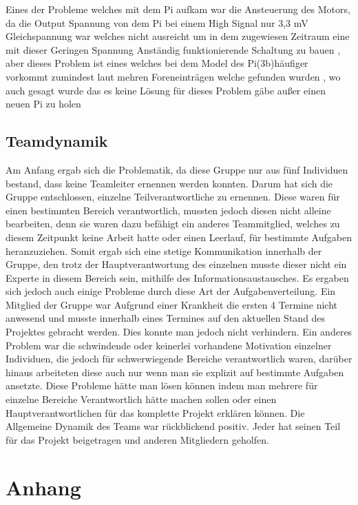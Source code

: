 \documentclass[notitlepage]{report}
\begin{document}
Eines der Probleme welches mit dem Pi aufkam war die Ansteuerung des Motors, da die Output Spannung von dem Pi bei einem High Signal nur 3,3 mV Gleichspannung war welches nicht ausreicht um in dem zugewiesen Zeitraum eine mit dieser Geringen Spannung Anst\"{a}ndig funktionierende Schaltung zu bauen , aber dieses Problem ist eines welches bei dem Model des Pi(3b)h\"{a}ufiger vorkommt zumindest laut mehren Foreneintr\"{a}gen welche  gefunden wurden , wo auch gesagt wurde das es keine L\"{o}sung f\"{u}r dieses Problem g\"{a}be au{\ss}er einen neuen Pi zu holen 


\section{Teamdynamik}

Am Anfang ergab sich die Problematik, da diese Gruppe nur aus f\"{u}nf Individuen bestand, dass keine Teamleiter ernennen werden  konnten. Darum hat sich die Gruppe entschlossen, einzelne Teilverantwortliche zu ernennen. Diese waren f\"{u}r einen bestimmten Bereich verantwortlich, mussten jedoch diesen nicht alleine bearbeiten, denn sie waren dazu bef\"{a}higt ein anderes Teammitglied, welches zu diesem Zeitpunkt keine Arbeit hatte oder einen Leerlauf, f\"{u}r bestimmte Aufgaben heranzuziehen.
Somit ergab sich eine stetige Kommunikation innerhalb der Gruppe, den trotz der Hauptverantwortung des einzelnen musste dieser nicht ein Experte in diesem Bereich sein, mithilfe des Informationsaustausches.
Es ergaben sich jedoch auch einige Probleme durch diese Art der Aufgabenverteilung. Ein Mitglied der Gruppe war Aufgrund einer Krankheit die ersten 4 Termine nicht anwesend und musste innerhalb eines Termines auf den aktuellen Stand des Projektes gebracht werden. Dies konnte man jedoch nicht verhindern. Ein anderes Problem war die schwindende oder keinerlei vorhandene Motivation einzelner Individuen, die jedoch f\"{u}r schwerwiegende Bereiche verantwortlich waren, dar\"{u}ber hinaus arbeiteten diese auch nur wenn man sie explizit auf bestimmte Aufgaben ansetzte. 
Diese Probleme h\"{a}tte man l\"{o}sen k\"{o}nnen indem man mehrere f\"{u}r einzelne Bereiche Verantwortlich h\"{a}tte machen sollen oder einen Hauptverantwortlichen f\"{u}r das komplette Projekt erkl\"{a}ren k\"{o}nnen.
Die Allgemeine Dynamik des Teams war r\"{u}ckblickend positiv. Jeder hat seinen Teil f\"{u}r das Projekt beigetragen und anderen Mitgliedern geholfen.


\chapter{Anhang}
\end{document}
